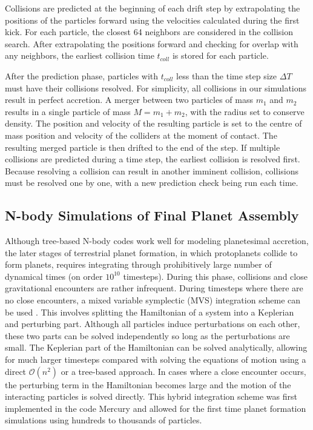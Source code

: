 Collisions are predicted at the beginning of each drift step by extrapolating the positions of the particles forward using the velocities calculated during the first kick. For each particle, the closest 64 neighbors are considered in the collision search. After extrapolating the positions forward and checking for overlap with any neighbors, the earliest collision time $t_{coll}$ is stored for each particle.

After the prediction phase, particles with $t_{coll}$ less than the time step size $\Delta T$ must have their collisions resolved. For simplicity, all collisions in our simulations result in perfect accretion. A merger between two particles of mass $m_{1}$ and $m_{2}$ results in a single particle of mass $M = m_{1} + m_{2}$, with the radius set to conserve density. The position and velocity of the resulting particle is set to the centre of mass position and velocity of the colliders at the moment of contact. The resulting merged particle is then drifted to the end of the step. If multiple collisions are predicted during a time step, the earliest collision is resolved first. Because resolving a collision can result in another imminent collision, collisions must be resolved one by one, with a new prediction check being run each time.

\subsection{N-body Simulations of Final Planet Assembly}

Although tree-based N-body codes work well for modeling planetesimal accretion, the later stages of terrestrial planet formation, in which protoplanets collide to form planets, requires integrating through prohibitively large number of dynamical times (on order $10^{10}$ timesteps). During this phase, collisions and close gravitational encounters are rather infrequent. During timesteps where there are no close encounters, a mixed variable symplectic (MVS) integration scheme can be used \cite{wisdom91}. This involves splitting the Hamiltonian of a system into a Keplerian and perturbing part. Although all particles induce perturbations on each other, these two parts can be solved independently so long as the perturbations are small. The Keplerian part of the Hamiltonian can be solved analytically, allowing for much larger timesteps compared with solving the equations of motion using a direct $\mathcal{O}(n^{2})$ or a tree-based approach. In cases where a close encounter occurs, the perturbing term in the Hamiltonian becomes large and the motion of the interacting particles is solved directly. This hybrid integration scheme was first implemented in the code {\sc Mercury} \cite{chambers99} and allowed for the first time planet formation simulations using hundreds to thousands of particles.


